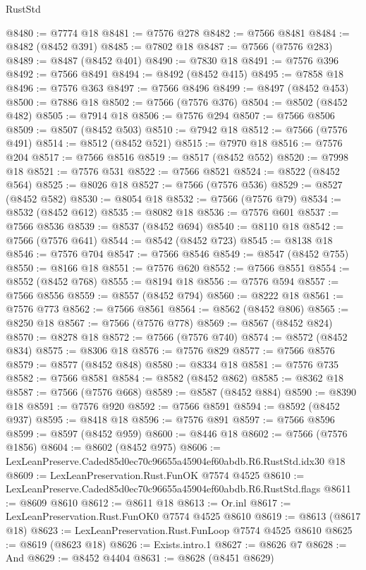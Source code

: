 \begin{lexlean}{RustStd}
\begin{coremodule}
@8480 := @7774 @18
@8481 := @7576 @278
@8482 := @7566 @8481
@8484 := @8482 (@8452 @391)
@8485 := @7802 @18
@8487 := @7566 (@7576 @283)
@8489 := @8487 (@8452 @401)
@8490 := @7830 @18
@8491 := @7576 @396
@8492 := @7566 @8491
@8494 := @8492 (@8452 @415)
@8495 := @7858 @18
@8496 := @7576 @363
@8497 := @7566 @8496
@8499 := @8497 (@8452 @453)
@8500 := @7886 @18
@8502 := @7566 (@7576 @376)
@8504 := @8502 (@8452 @482)
@8505 := @7914 @18
@8506 := @7576 @294
@8507 := @7566 @8506
@8509 := @8507 (@8452 @503)
@8510 := @7942 @18
@8512 := @7566 (@7576 @491)
@8514 := @8512 (@8452 @521)
@8515 := @7970 @18
@8516 := @7576 @204
@8517 := @7566 @8516
@8519 := @8517 (@8452 @552)
@8520 := @7998 @18
@8521 := @7576 @531
@8522 := @7566 @8521
@8524 := @8522 (@8452 @564)
@8525 := @8026 @18
@8527 := @7566 (@7576 @536)
@8529 := @8527 (@8452 @582)
@8530 := @8054 @18
@8532 := @7566 (@7576 @79)
@8534 := @8532 (@8452 @612)
@8535 := @8082 @18
@8536 := @7576 @601
@8537 := @7566 @8536
@8539 := @8537 (@8452 @694)
@8540 := @8110 @18
@8542 := @7566 (@7576 @641)
@8544 := @8542 (@8452 @723)
@8545 := @8138 @18
@8546 := @7576 @704
@8547 := @7566 @8546
@8549 := @8547 (@8452 @755)
@8550 := @8166 @18
@8551 := @7576 @620
@8552 := @7566 @8551
@8554 := @8552 (@8452 @768)
@8555 := @8194 @18
@8556 := @7576 @594
@8557 := @7566 @8556
@8559 := @8557 (@8452 @794)
@8560 := @8222 @18
@8561 := @7576 @773
@8562 := @7566 @8561
@8564 := @8562 (@8452 @806)
@8565 := @8250 @18
@8567 := @7566 (@7576 @778)
@8569 := @8567 (@8452 @824)
@8570 := @8278 @18
@8572 := @7566 (@7576 @740)
@8574 := @8572 (@8452 @834)
@8575 := @8306 @18
@8576 := @7576 @829
@8577 := @7566 @8576
@8579 := @8577 (@8452 @848)
@8580 := @8334 @18
@8581 := @7576 @735
@8582 := @7566 @8581
@8584 := @8582 (@8452 @862)
@8585 := @8362 @18
@8587 := @7566 (@7576 @668)
@8589 := @8587 (@8452 @884)
@8590 := @8390 @18
@8591 := @7576 @920
@8592 := @7566 @8591
@8594 := @8592 (@8452 @937)
@8595 := @8418 @18
@8596 := @7576 @891
@8597 := @7566 @8596
@8599 := @8597 (@8452 @959)
@8600 := @8446 @18
@8602 := @7566 (@7576 @1856)
@8604 := @8602 (@8452 @975)
@8606 := LexLeanPreserve.Caded85d0ec70c96655a45904ef60abdb.R6.RustStd.idx30 @18
@8609 := LexLeanPreservation.Rust.FunOK @7574 @4525
@8610 := LexLeanPreserve.Caded85d0ec70c96655a45904ef60abdb.R6.RustStd.flags
@8611 := @8609 @8610
@8612 := @8611 @18
@8613 := Or.inl
@8617 := LexLeanPreservation.Rust.FunOK0 @7574 @4525 @8610
@8619 := @8613 (@8617 @18)
@8623 := LexLeanPreservation.Rust.FunLoop @7574 @4525 @8610
@8625 := @8619 (@8623 @18)
@8626 := Exists.intro.{1}
@8627 := @8626 @7
@8628 := And
@8629 := @8452 @4404
@8631 := @8628 (@8451 @8629)

\end{coremodule}
\end{lexlean}
